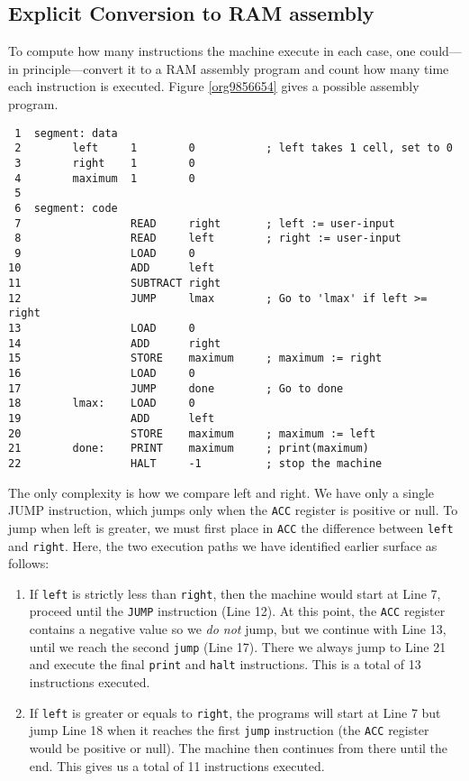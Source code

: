 \documentclass[11pt]{article}
\begin{document}
\subsection{Explicit Conversion to RAM assembly}
\label{sec:orgc335fc0}

To compute how many instructions the machine execute in each case, one
could---in principle---convert it to a RAM assembly program and count
how many time each instruction is executed. Figure \ref{org9856654}
gives a possible assembly program.

\begin{verbatim}
 1  segment: data
 2        left     1        0           ; left takes 1 cell, set to 0
 3        right    1        0           
 4        maximum  1        0
 5  
 6  segment: code
 7                 READ     right       ; left := user-input
 8                 READ     left        ; right := user-input 
 9                 LOAD     0
10                 ADD      left
11                 SUBTRACT right
12                 JUMP     lmax        ; Go to 'lmax' if left >= right
13                 LOAD     0
14                 ADD      right
15                 STORE    maximum     ; maximum := right
16                 LOAD     0
17                 JUMP     done        ; Go to done
18        lmax:    LOAD     0
19                 ADD      left
20                 STORE    maximum     ; maximum := left
21        done:    PRINT    maximum     ; print(maximum)
22                 HALT     -1          ; stop the machine
\end{verbatim}

The only complexity is how we compare left and right. We have only a
single JUMP instruction, which jumps only when the \texttt{ACC} register is
positive or null. To jump when left is greater, we must first place in
\texttt{ACC} the difference between \texttt{left} and \texttt{right}. Here, the two
execution paths we have identified earlier surface as follows:

\begin{enumerate}
\item If \texttt{left} is strictly less than \texttt{right}, then the machine would
start at Line 7, proceed until the \texttt{JUMP} instruction
(Line 12). At this point, the \texttt{ACC} register contains a
negative value so we \emph{do not} jump, but we continue with Line
13, until we reach the second \texttt{jump} (Line 17). There we
always jump to Line 21 and execute the final \texttt{print} and \texttt{halt}
instructions. This is a total of 13 instructions executed.

\item If \texttt{left} is greater or equals to \texttt{right}, the programs will start
at Line 7 but jump Line 18 when it reaches the first
\texttt{jump} instruction (the \texttt{ACC} register would be positive or
null). The machine then continues from there until the end. This
gives us a total of 11 instructions executed.
\end{enumerate}
\end{document}

